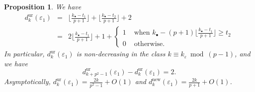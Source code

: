 \documentclass[12pt]{amsart}
\newtheorem{proposition}[subsection]{Proposition}
\theoremstyle{definition}
\numberwithin{equation}{subsection}
\newcommand{\new}{\mathrm{new}}
\newcommand{\unr}{\mathrm{ur}}
\begin{document}
\begin{proposition}
\label{P:dimension of Sunr}
We have
\begin{eqnarray}
\label{E:dkunr}
d_{k}^\unr(\varepsilon_1) &=&
\Big\lfloor \frac{k_\bullet - t_1}{p+1}\Big\rfloor + \Big\lfloor \frac{k_\bullet - t_2}{p+1}\Big\rfloor + 2
\\ \nonumber &=& 2\Big\lfloor \frac{k_\bullet - t_1}{p+1}\Big\rfloor + 1 +\begin{cases}
1 & \textrm{ when }k_\bullet - (p+1) \lfloor \frac{k_\bullet-t_1}{p+1}\rfloor  \geq t_2
\\
0 & \textrm{ otherwise.}
\end{cases}
\end{eqnarray}
In particular,  $d_{k}^\unr(\varepsilon_1)$ is non-decreasing in the class $k \equiv k_\varepsilon \bmod{(p-1)}$, and we have
$$d_{k+p^2-1}^\unr(\varepsilon_1) - d_{k}^\unr(\varepsilon_1) = 2.$$
Asymptotically, $d_{k}^\unr(\varepsilon_1) = \frac{2k}{p^2-1}+O(1)$ and  $d_k^\new(\varepsilon_1) = \frac{2k}{p+1}+O(1)$.
\end{proposition}
\end{document}
